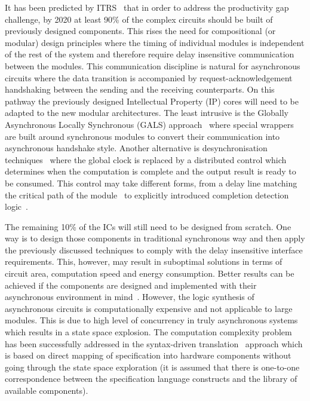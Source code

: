 It has been predicted by ITRS~\cite{ITRS_2011} that in order to address the productivity gap challenge, by 2020 at least 90\% of the complex circuits should be built of previously designed components. This rises the need for compositional (or modular) design principles where the timing of individual modules is independent of the rest of the system and  therefore require delay insensitive communication between the modules. This communication discipline is natural for asynchronous circuits where the data transition is accompanied by request-acknowledgement handshaking between the sending and the receiving counterparts. On this pathway the previously designed Intellectual Property (IP) cores will need to be adapted to the new modular architectures. The least intrusive is the Globally Asynchronous Locally Synchronous (GALS) approach~\cite{Chapiro_1984_phd} where special wrappers~\cite{Mullins_2007_async, Fan_2009_iccd} are built around synchronous modules to convert their communication into asynchronous handshake style. Another alternative is desynchronisation techniques~\cite{Cortadella_2006_ieeetcad} where the global clock is replaced by a distributed control which determines when the computation is complete and the output result is ready to be consumed. This control may take different forms, from a delay line matching the critical path of the module~\cite{Cortadella_2010_icicdt} to explicitly introduced completion detection logic~\cite{Kondratyev_2002_ieeedtc}.

The remaining 10\% of the ICs will still need to be designed from scratch. One way is to design those components in traditional synchronous way and then apply the previously discussed techniques to comply with the delay insensitive interface requirements. This, however, may result in suboptimal solutions in terms of circuit area, computation speed and energy consumption. Better results can be achieved if the components are designed and implemented with their asynchronous environment in mind~\cite{Martin_2006_ieeeproc}. However, the logic synthesis of asynchronous circuits is computationally expensive and not applicable to large modules. This is due to high level of concurrency in truly asynchronous systems which results in a state space explosion.  The computation complexity problem has been successfully addressed in the syntax-driven translation~\cite{balsa} approach which is based on direct mapping of specification into hardware components without going through the state space exploration (it is assumed that there is one-to-one correspondence between the specification language constructs and the library of available components).

